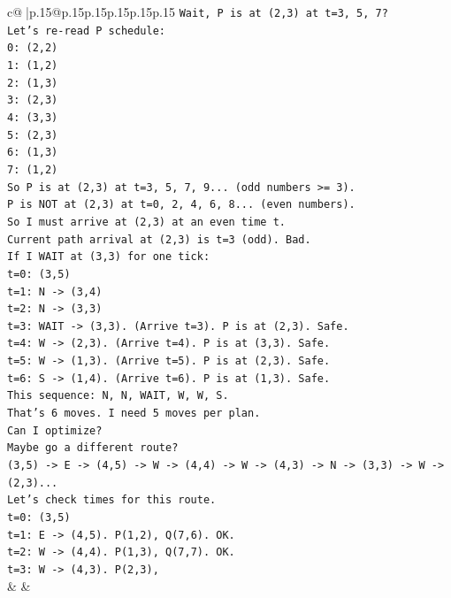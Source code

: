 \documentclass{article}
\begin{document}
{\begin{supertabular}{c@{$\;$}|p{.15\linewidth}@{}p{.15\linewidth}p{.15\linewidth}p{.15\linewidth}p{.15\linewidth}p{.15\linewidth}}
{{{\texttt{Wait, P is at (2,3) at t=3, 5, 7?} \\
\texttt{Let's re{-}read P schedule:} \\
\texttt{0: (2,2)} \\
\texttt{1: (1,2)} \\
\texttt{2: (1,3)} \\
\texttt{3: (2,3)} \\
\texttt{4: (3,3)} \\
\texttt{5: (2,3)} \\
\texttt{6: (1,3)} \\
\texttt{7: (1,2)} \\
\texttt{So P is at (2,3) at t=3, 5, 7, 9... (odd numbers >= 3).} \\
\texttt{P is NOT at (2,3) at t=0, 2, 4, 6, 8... (even numbers).} \\
\texttt{So I must arrive at (2,3) at an even time t.} \\
\texttt{Current path arrival at (2,3) is t=3 (odd). Bad.} \\
\texttt{If I WAIT at (3,3) for one tick:} \\
\texttt{t=0: (3,5)} \\
\texttt{t=1: N {-}> (3,4)} \\
\texttt{t=2: N {-}> (3,3)} \\
\texttt{t=3: WAIT {-}> (3,3). (Arrive t=3). P is at (2,3). Safe.} \\
\texttt{t=4: W {-}> (2,3). (Arrive t=4). P is at (3,3). Safe.} \\
\texttt{t=5: W {-}> (1,3). (Arrive t=5). P is at (2,3). Safe.} \\
\texttt{t=6: S {-}> (1,4). (Arrive t=6). P is at (1,3). Safe.} \\
\texttt{This sequence: N, N, WAIT, W, W, S.} \\
\texttt{That's 6 moves. I need 5 moves per plan.} \\
\texttt{Can I optimize?} \\
\texttt{Maybe go a different route?} \\
\texttt{(3,5) {-}> E {-}> (4,5) {-}> W {-}> (4,4) {-}> W {-}> (4,3) {-}> N {-}> (3,3) {-}> W {-}> (2,3)...} \\
\texttt{Let's check times for this route.} \\
\texttt{t=0: (3,5)} \\
\texttt{t=1: E {-}> (4,5). P(1,2), Q(7,6). OK.} \\
\texttt{t=2: W {-}> (4,4). P(1,3), Q(7,7). OK.} \\
\texttt{t=3: W {-}> (4,3). P(2,3),} \\
            }
        }
    }
    & & \\ \\


\end{supertabular}}
\end{document}
